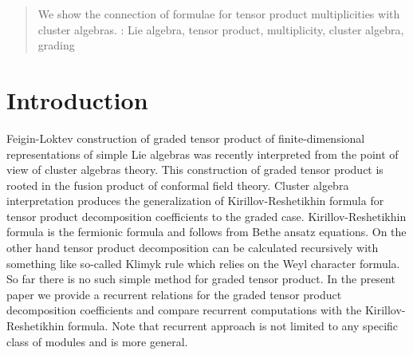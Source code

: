 \documentclass[12pt]{iopart}
\begin{document}

\author{V.D.~Lyakhovsky$^1$, A.A.~Nazarov$^{1,2}$, O.V.~Postnova$^{1}$, A..~Komisartchuk$^{1}$}
\address{ $^1$ Department of High-energy and elementary particle physics,  St Petersburg State University, 198904, Saint-Petersburg, Russia}



\begin{abstract}

We show the connection of formulae for tensor product multiplicities with cluster algebras. 
: Lie algebra, tensor product, multiplicity, cluster algebra, grading
\end{abstract}

\submitto{\jpa}

\section{Introduction}
\label{sec:introduction}

Feigin-Loktev construction of graded tensor product of finite-dimensional representations of simple
Lie algebras was recently interpreted from the point of view of cluster algebras theory. This
construction of graded tensor product is rooted in the fusion product of conformal field theory.
Cluster algebra interpretation produces the generalization of Kirillov-Reshetikhin formula for
tensor product decomposition coefficients to the graded case. Kirillov-Reshetikhin formula is the
fermionic formula and follows from Bethe ansatz equations. On the other hand tensor product
decomposition can be calculated recursively with something like so-called Klimyk rule which relies
on the Weyl character formula. So far there is no such simple method for graded tensor product. In
the present paper we provide a recurrent relations for the graded tensor product decomposition
coefficients and compare recurrent computations with the Kirillov-Reshetikhin formula. Note that
recurrent approach is not limited to any specific class of modules and is more general. 
\end{document}
